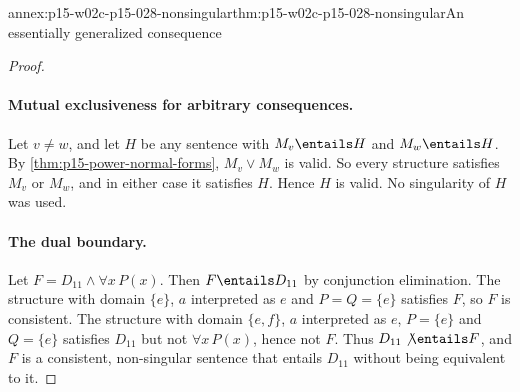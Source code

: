 \begin{annexitem}{annex:p15-w02c-p15-028-nonsingular}{thm:p15-w02c-p15-028-nonsingular}{An essentially generalized consequence}
\begin{proof}
\paragraph{Mutual exclusiveness for arbitrary consequences.}
Let \(v\neq w\), and let \(H\) be any sentence with
\(M_v\entails H\) and \(M_w\entails H\). By
\cref{thm:p15-power-normal-forms}, \(M_v\lor M_w\) is valid. So every
structure satisfies \(M_v\) or \(M_w\), and in either case it satisfies
\(H\). Hence \(H\) is valid. No singularity of \(H\) was used.

\paragraph{The dual boundary.}
Let \(F=D_{11}\land\forall x\,P(x)\). Then \(F\entails D_{11}\) by
conjunction elimination. The structure with domain \(\{e\}\), \(a\)
interpreted as \(e\) and \(P=Q=\{e\}\) satisfies \(F\), so \(F\) is
consistent. The structure with domain \(\{e,f\}\), \(a\) interpreted
as \(e\), \(P=\{e\}\) and \(Q=\{e\}\) satisfies \(D_{11}\) but not
\(\forall x\,P(x)\), hence not \(F\). Thus \(D_{11}\not\entails F\),
and \(F\) is a consistent, non-singular sentence that entails
\(D_{11}\) without being equivalent to it.
\end{proof}
\end{annexitem}

